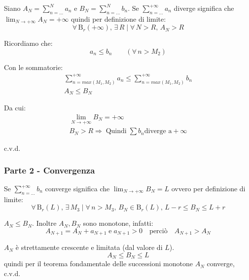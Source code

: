 \documentclass[../../analisi1]{subfiles}
\begin{document}
                Siano \(A_N = \sum_{n=\dots}^{N} a_n\) e \(B_N = \sum_{n=\dots}^{N} b_n\). 
                Se \(\sum_{n=\dots}^{+\infty} a_n\) diverge significa che \(\lim_{N \to +\infty} A_N = +\infty\) 
                quindi per definizione di limite:
                \[\forall \, \mathrm{B}_r(+\infty), \, \exists \, R \mid \forall \, N > R, \, A_N > R\]

                Ricordiamo che:
                \[ a_n \leqslant b_n \qquad (\forall \, n > M_2) \]

                Con le sommatorie:
                \begin{gather*}
                    \sum_{n = max(M_1,M_2)}^{+\infty} a_n \leqslant \sum_{n = max(M_1,M_2)}^{+\infty} b_n\\
                    A_N \leqslant B_N
                \end{gather*}

                Da cui:
                \begin{gather*}  
                    \lim_{N \to +\infty} B_N = +\infty\\
                    B_N > R \Rightarrow \; \text{Quindi} \; \sum b_n \text{diverge a} +\infty
                \end{gather*}

                c.v.d.

            \subsubsection*{Parte 2 - Convergenza}

                Se \(\sum_{n=\dots}^{+\infty} b_n\) converge significa che \(   \lim_{N \to +\infty} B_N = L  \) ovvero per definizione di limite:
                \[  \forall \, \mathrm{B}_r(L), \, \exists \, M_3 \mid \forall \, n>M_3, \, B_N \in \mathrm{B}_r(L), \,  L-r \leqslant B_N \leqslant L + r   \]
                
                \(A_N \leqslant B_N\). Inoltre \(A_N, B_N\) sono monotone, infatti:
                \[  A_{N+1} = A_N + a_{N+1}\; \text{e} \; a_{N+1} > 0 \quad \text{perciò} \quad A_{N+1} > A_N\]

                \(A_N\) è strettamente crescente e limitata (dal valore di \(L\)).
                \[  A_N \leqslant B_N \leqslant L \]
                quindi per il teorema fondamentale delle successioni monotone \(A_N\) converge, c.v.d.
\end{document}
